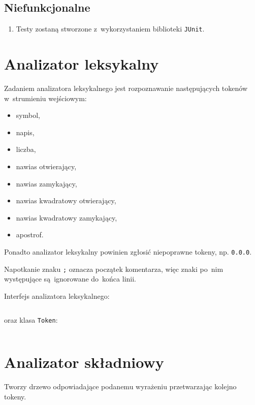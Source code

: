 \documentclass[a4paper,11pt]{article}
\newcommand{\impl}[1]{
\inputminted[fontsize=\footnotesize,frame=single,samepage=true]{java}{impl/#1.java}
}
\begin{document}
\subsection{Niefunkcjonalne}

\begin{enumerate}
\item Testy zostaną stworzone z~wykorzystaniem biblioteki \verb+JUnit+.
\end{enumerate}

\section{Analizator leksykalny}

Zadaniem analizatora leksykalnego jest rozpoznawanie następujących tokenów
w~strumieniu wejściowym:

\begin{itemize}
\item symbol,
\item napis,
\item liczba,
\item nawias otwierający,
\item nawias zamykający,
\item nawias kwadratowy otwierający,
\item nawias kwadratowy zamykający,
\item apostrof.
\end{itemize}

Ponadto analizator leksykalny powinien zgłosić niepoprawne tokeny, np.
\verb+0.0.0+.

Napotkanie znaku \verb+;+ oznacza początek komentarza, więc znaki po~nim
występujące są~ignorowane do~końca linii.

Interfejs analizatora leksykalnego:
\impl{Lexer}

oraz klasa \verb+Token+:
\impl{Token}

\section{Analizator składniowy}

Tworzy drzewo odpowiadające podanemu wyrażeniu przetwarzając kolejno tokeny.
\end{document}

